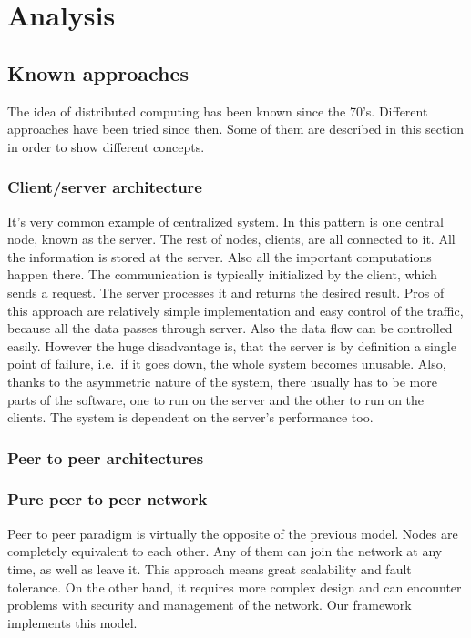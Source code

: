 \chapter{Analysis}\label{analysis}

\section{Known approaches}\label{known-approaches}

The idea of distributed computing has been known since the 70's.
Different approaches have been tried since then. Some of them are
described in this section in order to show different concepts.

\subsection{Client/server architecture}\label{clientserver-architecture}

It's very common example of centralized system. In this pattern is one
central node, known as the server. The rest of nodes, clients, are all
connected to it. All the information is stored at the server. Also all
the important computations happen there. The communication is typically
initialized by the client, which sends a request. The server processes
it and returns the desired result. Pros of this approach are relatively
simple implementation and easy control of the traffic, because all the
data passes through server. Also the data flow can be controlled easily.
However the huge disadvantage is, that the server is by definition a
single point of failure, i.e.~if it goes down, the whole system becomes
unusable. Also, thanks to the asymmetric nature of the system, there
usually has to be more parts of the software, one to run on the server
and the other to run on the clients. The system is dependent on the
server's performance too.

\subsection{Peer to peer
architectures}\label{peer-to-peer-architectures}

\subsection*{Pure peer to peer network}

Peer to peer paradigm is virtually the opposite of the previous model.
Nodes are completely equivalent to each other. Any of them can join the
network at any time, as well as leave it. This approach means great
scalability and fault tolerance. On the other hand, it requires more
complex design and can encounter problems with security and management
of the network. Our framework implements this model.

